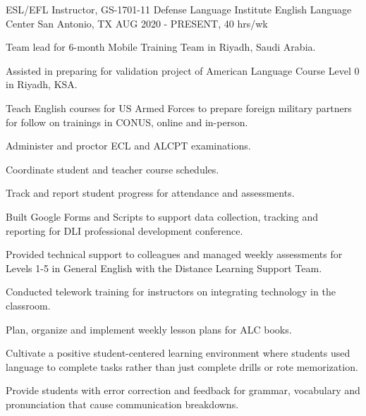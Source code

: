 


\begin{cventries}


\cventry
{ESL/EFL Instructor, GS-1701-11} %
{Defense Language Institute English Language Center} %
{San Antonio, TX} %
{AUG 2020 - PRESENT, 40 hrs/wk} %
{ %
\begin{cvitems}
\item {Team lead for 6-month Mobile Training Team in Riyadh, Saudi Arabia.}
\item {Assisted in preparing for validation project of American Language Course Level 0 in Riyadh, KSA.}
\item {Teach English courses for US Armed Forces to prepare foreign military partners for follow on trainings in CONUS, online and in-person.}
\item {Administer and proctor ECL and ALCPT examinations.}
\item {Coordinate student and teacher course schedules.}
\item {Track and report student progress for attendance and assessments.}
\item {Built Google Forms and Scripts to support data collection, tracking and reporting for DLI professional development conference.}
\item {Provided technical support to colleagues and managed weekly assessments for Levels 1-5 in General English with the Distance Learning Support Team.}
\item {Conducted telework training for instructors on integrating technology in the classroom.}
\item {Plan, organize and implement weekly lesson plans for ALC books.}
\item {Cultivate a positive student-centered learning environment where students used language to complete tasks rather than just complete drills or rote memorization.}
\item {Provide students with error correction and feedback for grammar, vocabulary and pronunciation that cause communication breakdowns.}
\end{cvitems}
}


\end{cventries}
